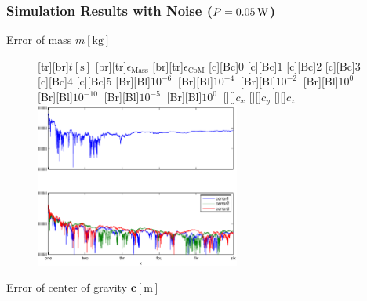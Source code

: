 \documentclass[student,noshadow]{ITRslides}
\renewcommand{\vec}[1]{\boldsymbol{#1}}
\renewcommand{\vec}[1]{\boldsymbol{#1}}
\newcommand{\scr}[1]{\mathrm{#1}}
\begin{document}
\begin{frame}
	\frametitle{Simulation Results with Noise ($P = \unit[0.05]{W}$)}
	\begin{center}
		Error of mass $m \left[\mathrm{kg}\right]$
		\begin{figure}
			[tr][br]{$t\left[\mathrm{s}\right]$}
			[br][tr]{$\epsilon_\scr{Mass}$}
			[br][tr]{$\epsilon_\scr{CoM}$}
			[c][Bc]{$0$}
			[c][Bc]{$1$}
			[c][Bc]{$2$}
			[c][Bc]{$3$}
			[c][Bc]{$4$}
			[c][Bc]{$5$}
			[Br][Bl]{$10^{-6}\  $}
			[Br][Bl]{$10^{-4}\  $}
			[Br][Bl]{$10^{-2}\  $}
			[Br][Bl]{$10^0\  $}
			[Br][Bl]{$10^{-10}\  $}
			[Br][Bl]{$10^{-5}\  $}
			[Br][Bl]{$10^0\  $}
			[][]{\tiny $c_{x}$}
			[][]{\tiny $c_{y}$}
			[][]{\tiny $c_{z}$}
			\includegraphics[width=0.6\textwidth]{fig/mass_multi_noise.eps}
		\end{figure}
		Error of center of gravity $\vec{c} \left[\mathrm{m}\right]$
	\end{center}
\end{frame}
\end{document}
